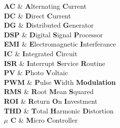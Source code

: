 \documentclass[12pt, oneside]{Thesis} %
\begin{document}
{
\textbf{AC}  & \textbf{A}lternating \textbf{C}urrent\\

\textbf{DC}  & \textbf{D}irect \textbf{C}urrent\\

\textbf{DG}  & \textbf{D}istributed \textbf{G}enerator\\

\textbf{DSP}  & \textbf{D}igital \textbf{S}ignal \textbf{P}rocessor\\

\textbf{EMI}  & \textbf{E}lectromagnetic \textbf{I}nterferance\\

\textbf{IC}  & \textbf{I}ntegrated \textbf{C}ircuit\\

\textbf{ISR}  & \textbf{I}nterrupt \textbf{S}ervice \textbf{R}outine\\

\textbf{PV} & \textbf{P}hoto \textbf{V}oltaic \\

\textbf{PWM} & \textbf{P}ulse \textbf{W}idth \textbf{Modulation} \\

\textbf{RMS} & \textbf{R}oot \textbf{M}ean \textbf{S}quared \\

\textbf{ROI} & \textbf{R}eturn \textbf{O}n \textbf{I}nvestment \\

\textbf{THD} & \textbf{T}otal \textbf{H}armonic \textbf{D}istortion \\

\textbf{$\mu $ C}  & \textbf{M}icro \textbf{C}ontroller \\

}


\clearpage %

\end{document}
